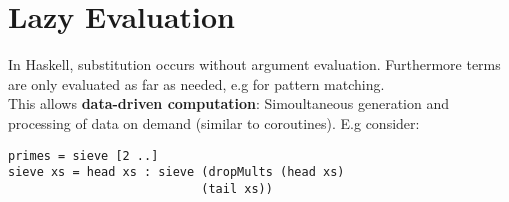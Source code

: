 \section{Lazy Evaluation}
In Haskell, substitution occurs without argument evaluation. Furthermore terms are only evaluated as far as needed, e.g for pattern matching.\\
This allows \textbf{data-driven computation}: Simoultaneous generation and processing of data on demand (similar to coroutines). E.g consider:
\begin{lstlisting}
primes = sieve [2 ..]
sieve xs = head xs : sieve (dropMults (head xs) 
                           (tail xs))
\end{lstlisting}
